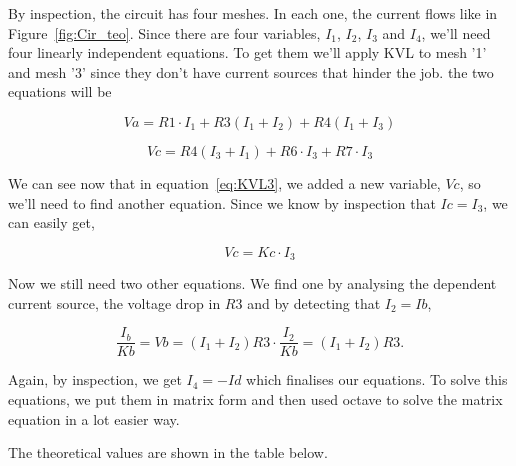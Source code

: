 By inspection, the circuit has four meshes. In each one, the current flows like in Figure~\ref{fig:Cir_teo}. Since there are four variables, $I_1$, $I_2$, $I_3$ and $I_4$, we'll need four linearly independent equations. To get them we'll apply KVL to mesh '1' and mesh '3' since they don't have current sources that hinder the job. the two equations will be

\begin{equation}
  Va = R1 \cdot I_1+R3(I_1 + I_2) + R4(I_1 + I_3)
  \label{eq:KVL1}
\end{equation}

\begin{equation}
  Vc = R4(I_3 + I_1) + R6 \cdot I_3 + R7 \cdot I_3
  \label{eq:KVL3}
\end{equation}

\par \noindent We can see now that in equation~\ref{eq:KVL3}, we added a new variable, $Vc$, so we'll need to find another equation. Since we know by inspection that $Ic=I_3$, we can easily get,

\begin{equation}
  Vc = Kc \cdot I_3
  \label{eq:Vc}
\end{equation}

\par \noindent Now we still need two other equations. We find one by analysing the dependent current source, the voltage drop in $R3$ and by detecting that $I_2=Ib$,

 \begin{equation}
  \frac{I_b}{Kb} = Vb = (I_1 + I_2)R3 \cdot \frac{I_2}{Kb} = (I_1 + I_2)R3.
  \label{eq:Vb}
\end{equation}

\par \noindent Again, by inspection, we get $I_4 = -Id$ which finalises our equations.
To solve this equations, we put them in matrix form and then used octave to solve the matrix equation in a lot easier way.

\par \noindent The theoretical values are shown in the table below.
\vspace{5mm}
\begin{table}
\centering
\begin{tabularx}{0.8\textwidth} {
  | >{\raggedright\arraybackslash}X
  | >{\raggedleft\arraybackslash}X | }
 \hline

\end{tabularx}
\end{table}
\vspace{5mm}
